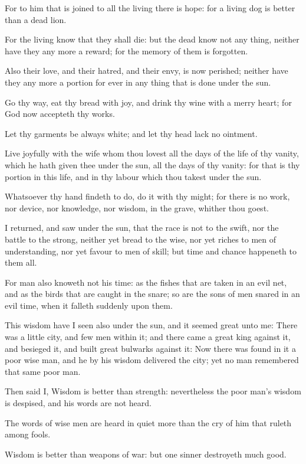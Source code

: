 \Verse For to him that is joined to all the living there is hope: for a living dog is better than a dead lion.

\Verse For the living know that they shall die: but the dead know not any thing, neither have they any more a reward; for the memory of them is forgotten.

\Verse Also their love, and their hatred, and their envy, is now perished; neither have they any more a portion for ever in any thing that is done under the sun.

\Verse Go thy way, eat thy bread with joy, and drink thy wine with a merry heart; for God now accepteth thy works.

\Verse Let thy garments be always white; and let thy head lack no ointment.

\Verse Live joyfully with the wife whom thou lovest all the days of the life of thy vanity, which he hath given thee under the sun, all the days of thy vanity: for that is thy portion in this life, and in thy labour which thou takest under the sun.

\Verse Whatsoever thy hand findeth to do, do it with thy might; for there is no work, nor device, nor knowledge, nor wisdom, in the grave, whither thou goest.

\Verse I returned, and saw under the sun, that the race is not to the swift, nor the battle to the strong, neither yet bread to the wise, nor yet riches to men of understanding, nor yet favour to men of skill; but time and chance happeneth to them all.

\Verse For man also knoweth not his time: as the fishes that are taken in an evil net, and as the birds that are caught in the snare; so are the sons of men snared in an evil time, when it falleth suddenly upon them.

\Verse This wisdom have I seen also under the sun, and it seemed great unto me: \Verse There was a little city, and few men within it; and there came a great king against it, and besieged it, and built great bulwarks against it: \Verse Now there was found in it a poor wise man, and he by his wisdom delivered the city; yet no man remembered that same poor man.

\Verse Then said I, Wisdom is better than strength: nevertheless the poor man's wisdom is despised, and his words are not heard.

\Verse The words of wise men are heard in quiet more than the cry of him that ruleth among fools.

\Verse Wisdom is better than weapons of war: but one sinner destroyeth much good.


